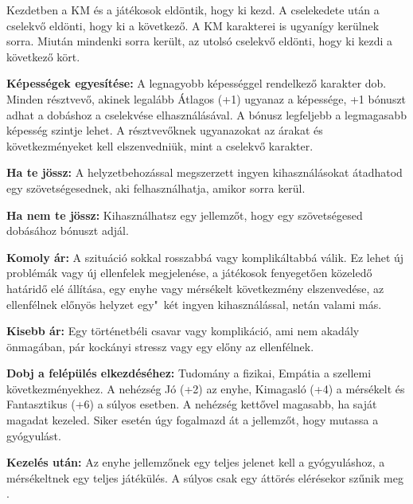 \newpage

\begin{multicols*}{2}


Kezdetben a KM és a játékosok eldöntik, hogy ki kezd. A cselekedete után a cselekvő eldönti, hogy ki a következő. A KM karakterei is ugyanígy kerülnek sorra. Miután mindenki sorra került, az utolsó cselekvő eldönti, hogy ki kezdi a következő kört.


\textbf{Képességek egyesítése:} A legnagyobb képességgel rendelkező karakter dob. Minden résztvevő, akinek legalább Átlagos (+1) ugyanaz a képessége, +1 bónuszt adhat a dobáshoz a cselekvése elhasználásával. A bónusz legfeljebb a legmagasabb képesség szintje lehet. A résztvevőknek ugyanazokat az árakat és következményeket kell elszenvedniük, mint a cselekvő karakter.

\textbf{Ha te jössz:} A helyzetbehozással megszerzett ingyen kihasználásokat átadhatod egy szövetségesednek, aki felhasználhatja, amikor sorra kerül.

\textbf{Ha nem te jössz:} Kihasználhatsz egy jellemzőt, hogy egy szövetségesed dobásához bónuszt adjál.


\textbf{Komoly ár:} A szituáció sokkal rosszabbá vagy komplikáltabbá válik. Ez lehet új problémák vagy új ellenfelek megjelenése, a játékosok fenyegetően közeledő határidő elé állítása, egy enyhe vagy mérsékelt következmény elszenvedése, az ellenfélnek előnyös helyzet egy"~két ingyen kihasználással, netán valami más.

\textbf{Kisebb ár:} Egy történetbéli csavar vagy komplikáció, ami nem akadály önmagában, pár kockányi stressz vagy egy előny  az ellenfélnek.


\textbf{Dobj a felépülés elkezdéséhez:} Tudomány a fizikai, Empátia a szellemi következményekhez. A nehézség Jó (+2) az enyhe, Kimagasló (+4) a mérsékelt és Fantasztikus (+6) a súlyos esetben. A nehézség kettővel magasabb, ha saját magadat kezeled. Siker esetén úgy fogalmazd át a jellemzőt, hogy mutassa a gyógyulást.

\textbf{Kezelés után:} Az enyhe jellemzőnek egy teljes jelenet kell a gyógyuláshoz, a mérsékeltnek egy teljes játékülés. A súlyos csak egy áttörés elérésekor szűnik meg .


\end{multicols*}
